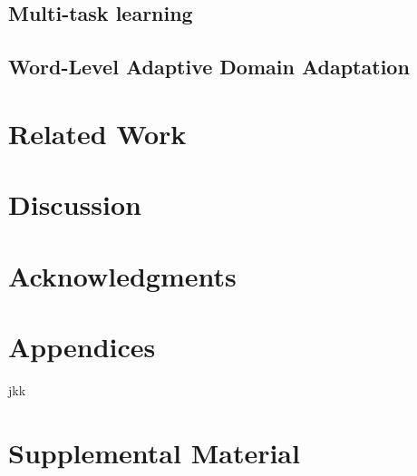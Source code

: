 \documentclass[11pt,a4paper]{article}
\begin{document}
\subsection{Multi-task learning}

\subsection{Word-Level Adaptive Domain Adaptation \label{sec:wada}}

\section{Related Work \label{sec:related}}

\section{Discussion \label{sec:discussion}}


\section*{Acknowledgments}



\appendix
\section{Appendices}
\label{sec:appendix}
jkk
\section{Supplemental Material}
\label{sec:supplemental}
\end{document}
